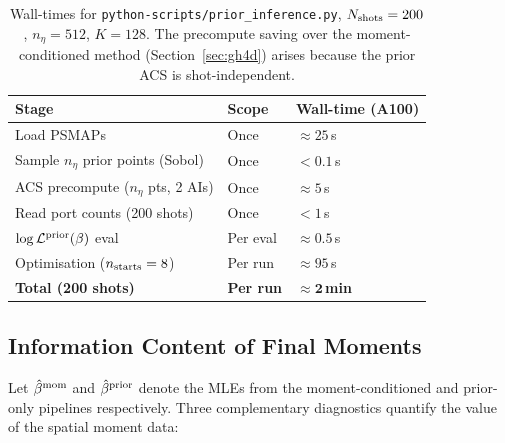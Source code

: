 \documentclass[11pt,a4paper]{article}
\begin{document}
\begin{table}[h]
\centering
\begin{tabular}{lll}
\toprule
Stage & Scope & Wall-time (A100) \\
\midrule
Load PSMAPs                                 & Once           & ${\approx}25$\,s \\
Sample $n_\eta$ prior points (Sobol)        & Once           & ${<}0.1$\,s \\
ACS precompute ($n_\eta$ pts, 2 AIs)        & Once           & ${\approx}5$\,s \\
Read port counts (200 shots)                & Once           & ${<}1$\,s \\
$\log\mathcal{L}^{\rm prior}(\beta)$ eval   & Per eval       & ${\approx}0.5$\,s \\
Optimisation ($n_{\rm starts}=8$)          & Per run        & ${\approx}95$\,s \\
\textbf{Total (200 shots)}                  & \textbf{Per run} & $\mathbf{{\approx}2}$\,\textbf{min} \\
\bottomrule
\end{tabular}
\caption{Wall-times for \texttt{python-scripts/prior\_inference.py},
$N_{\rm shots}=200$, $n_\eta=512$, $K=128$.  The precompute saving over the
moment-conditioned method (Section~\ref{sec:gh4d}) arises because the prior
ACS is shot-independent.}
\label{tab:prior_cost}
\end{table}

\subsection{Information Content of Final Moments}
\label{sec:moment_info}

Let $\hat\beta^{\rm mom}$ and $\hat\beta^{\rm prior}$ denote the MLEs from
the moment-conditioned and prior-only pipelines respectively.  Three
complementary diagnostics quantify the value of the spatial moment data:
\end{document}
